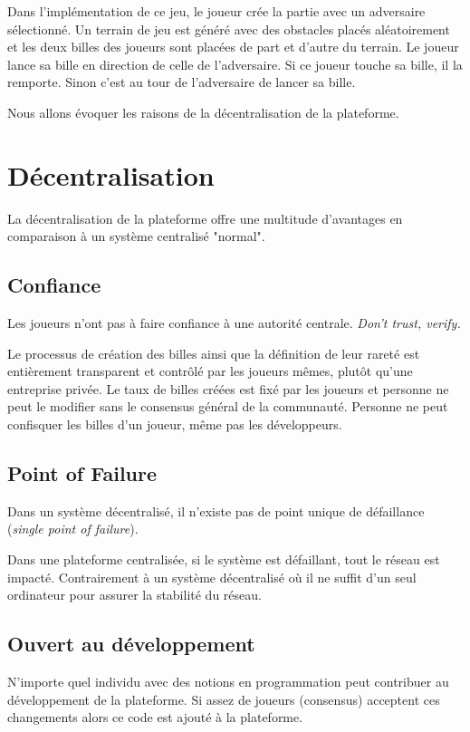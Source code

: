 \documentclass{article}
\begin{document}
Dans l'implémentation de ce jeu, le joueur crée la partie avec un adversaire sélectionné.
Un terrain de jeu est généré avec des obstacles placés aléatoirement et les deux billes des joueurs sont placées de part et d'autre du terrain. Le joueur lance sa bille en direction de celle de l'adversaire. Si ce joueur touche sa bille, il la remporte. Sinon c'est au tour de l'adversaire de lancer sa bille. 

Nous allons évoquer les raisons de la décentralisation de la plateforme.

\section{Décentralisation}
La décentralisation de la plateforme offre une multitude d'avantages en comparaison à un système centralisé "normal".

\subsection{Confiance}
Les joueurs n'ont pas à faire confiance à une autorité centrale. 
\textit{Don't trust, verify.}

Le processus de création des billes ainsi que la définition de leur rareté est entièrement transparent et contrôlé par les joueurs mêmes, plutôt qu'une entreprise privée. Le taux de billes créées est fixé par les joueurs et personne ne peut le modifier sans le consensus général de la communauté. Personne ne peut confisquer les billes d'un joueur, même pas les développeurs.

\subsection{Point of Failure}
Dans un système décentralisé, il n'existe pas de point unique de défaillance (\textit{single point of failure}). 

Dans une plateforme centralisée, si le système est défaillant, tout le réseau est impacté. Contrairement à un système décentralisé où il ne suffit d'un seul ordinateur pour assurer la stabilité du réseau.

\subsection{Ouvert au développement}
N'importe quel individu avec des notions en programmation peut contribuer au développement de la plateforme.
Si assez de joueurs (consensus) acceptent ces changements alors ce code est ajouté à la plateforme.
\end{document}

